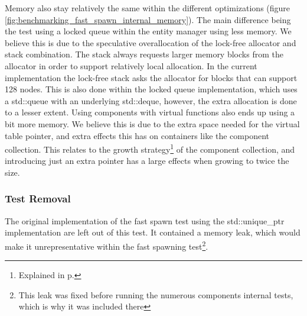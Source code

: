 Memory also stay relatively the same within the different optimizations (figure \ref{fig:benchmarking_fast_spawn_internal_memory}).
The main difference being the test using a locked queue within the entity manager using less memory.
We believe this is due to the speculative overallocation of the lock-free allocator and stack combination.
The stack always requests larger memory blocks from the allocator in order to support relatively local allocation.
In the current implementation the lock-free stack asks the allocator for blocks that can support 128 nodes.
This is also done within the locked queue implementation, which uses a std::queue with an underlying std::deque,
however, the extra allocation is done to a lesser extent.
Using components with virtual functions also ends up using a bit more memory.
We believe this is due to the extra space needed for the virtual table pointer,
and extra effects this has on containers like the component collection.
This relates to the growth strategy\footnote{Explained in p.\pageref{par:detailed_component_collection_reallocation_growth}} of the component collection,
and introducing just an extra pointer has a large effects when growing to twice the size.

\subsubsection{Test Removal}
The original implementation of the fast spawn test using the std::unique\_ptr implementation are left out of this test.
It contained a memory leak, which would make it unrepresentative within the fast spawning test\footnote{This leak was fixed before running the numerous components internal tests, which is why it was included there}.
